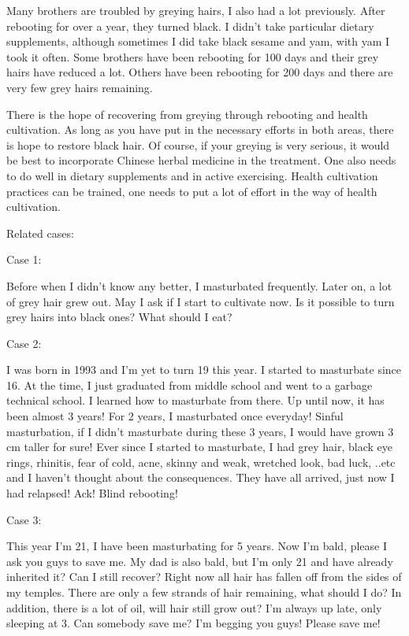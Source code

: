 \documentclass[
]{book}
\begin{document}
Many brothers are troubled by greying hairs, I also had a lot previously. After rebooting for over a year, they turned black. I didn't take particular dietary supplements, although sometimes I did take black sesame and yam, with yam I took it often. Some brothers have been rebooting for 100 days and their grey hairs have reduced a lot. Others have been rebooting for 200 days and there are very few grey hairs remaining.

There is the hope of recovering from greying through rebooting and health cultivation. As long as you have put in the necessary efforts in both areas, there is hope to restore black hair. Of course, if your greying is very serious, it would be best to incorporate Chinese herbal medicine in the treatment. One also needs to do well in dietary supplements and in active exercising. Health cultivation practices can be trained, one needs to put a lot of effort in the way of health cultivation.

Related cases:

Case 1:

Before when I didn't know any better, I masturbated frequently. Later on, a lot of grey hair grew out. May I ask if I start to cultivate now. Is it possible to turn grey hairs into black ones? What should I eat?

Case 2:

I was born in 1993 and I'm yet to turn 19 this year. I started to masturbate since 16. At the time, I just graduated from middle school and went to a garbage technical school. I learned how to masturbate from there. Up until now, it has been almost 3 years! For 2 years, I masturbated once everyday! Sinful masturbation, if I didn't masturbate during these 3 years, I would have grown 3 cm taller for sure! Ever since I started to masturbate, I had grey hair, black eye rings, rhinitis, fear of cold, acne, skinny and weak, wretched look, bad luck, ..etc and I haven't thought about the consequences. They have all arrived, just now I had relapsed! Ack! Blind rebooting!

Case 3:

This year I'm 21, I have been masturbating for 5 years. Now I'm bald, please I ask you guys to save me. My dad is also bald, but I'm only 21 and have already inherited it? Can I still recover? Right now all hair has fallen off from the sides of my temples. There are only a few strands of hair remaining, what should I do? In addition, there is a lot of oil, will hair still grow out? I'm always up late, only sleeping at 3. Can somebody save me? I'm begging you guys! Please save me!
\end{document}
